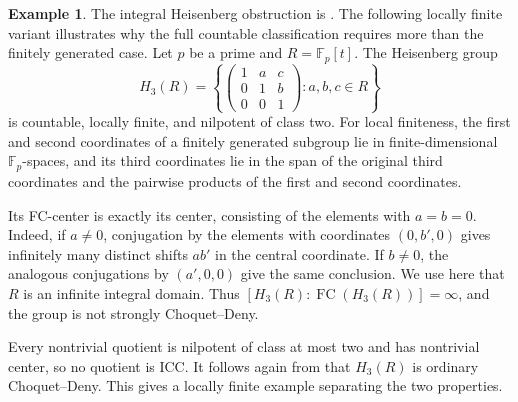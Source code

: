 \documentclass[11pt,letterpaper]{amsart}
\theoremstyle{definition}
\newtheorem{example}[theorem]{Example}
\theoremstyle{remark}
\newcommand{\F}{\mathbb F}
\DeclareMathOperator{\FC}{FC}
\begin{document}
\begin{example}\label{ex:heisenberg}
The integral Heisenberg obstruction is \cite[Example~5.5]{DD}.
The following locally finite variant illustrates why the full countable
classification requires more than the finitely generated case.
Let $p$ be a prime and $R=\F_p[t]$. The Heisenberg group
\[
 H_3(R)=\left\{\begin{pmatrix}1&a&c\\0&1&b\\0&0&1\end{pmatrix}:
 a,b,c\in R\right\}
\]
is countable, locally finite, and nilpotent of class two. For local
finiteness, the first and second coordinates of a finitely generated
subgroup lie in finite-dimensional $\F_p$-spaces, and its third
coordinates lie in the span of the original third coordinates and
the pairwise products of the first and second coordinates.

Its FC-center is exactly its center, consisting of the elements with
$a=b=0$. Indeed, if $a\ne0$, conjugation by the elements with coordinates
$(0,b',0)$ gives infinitely many distinct shifts $ab'$ in the central coordinate.
If $b\ne0$, the analogous conjugations by $(a',0,0)$ give the same
conclusion. We use here that $R$ is an infinite integral domain.
Thus $[H_3(R):\FC(H_3(R))]=\infty$, and the group is not strongly
Choquet--Deny.

Every nontrivial quotient is nilpotent of class at most two and has
nontrivial center, so no quotient is ICC. It follows again from
\cite[Theorem 1]{FHTVF} that $H_3(R)$ is ordinary Choquet--Deny.
This gives a locally finite example separating the two properties.
\end{example}
\end{document}
